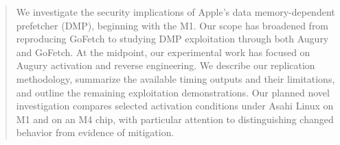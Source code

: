\begin{abstract}
We investigate the security implications of Apple's data memory-dependent prefetcher (DMP), beginning with the M1. Our scope has broadened from reproducing GoFetch to studying DMP exploitation through both Augury and GoFetch. At the midpoint, our experimental work has focused on Augury activation and reverse engineering. We describe our replication methodology, summarize the available timing outputs and their limitations, and outline the remaining exploitation demonstrations. Our planned novel investigation compares selected activation conditions under Asahi Linux on M1 and on an M4 chip, with particular attention to distinguishing changed behavior from evidence of mitigation.
\end{abstract}
